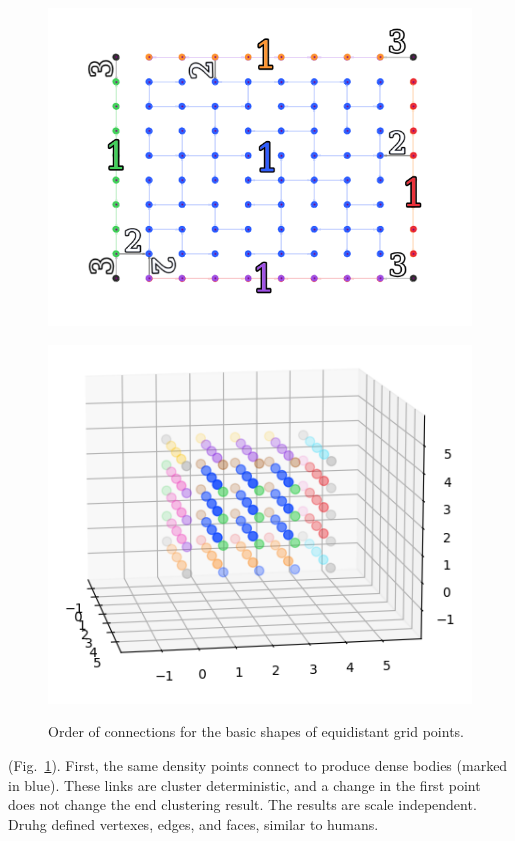 \documentclass[12pt, a4paper, twocolumn]{article}
\newcommand{\githubPics}{https://raw.githubusercontent.com/artamono1/druhg/master/papers/druhg/}
\begin{document}
\begin{figure}[!htb]
\begin{minipage}[c]{0.40\linewidth}
    \href{\githubPics pdn_square.png}{\includegraphics[width=\linewidth]{pdn_square.png}}
  \end{minipage}\hfill
  \begin{minipage}[c]{0.40\linewidth}
    \href{\githubPics run_cube.png}{\includegraphics[width=\linewidth]{run_cube.png}}
  \end{minipage}
  \caption{Order of connections for the basic shapes of equidistant grid points.} \label{fig:Geoshapes}
\end{figure}

(Fig.~\ref{fig:Geoshapes}). First, the same density points connect to produce dense bodies (marked in blue). These links are cluster deterministic, and a change in the first point does not change the end clustering result. The results are scale independent.
Druhg defined vertexes, edges, and faces, similar to humans. 
\end{document}
